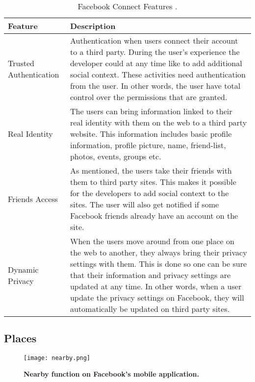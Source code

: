 \begin{center}
\begin{table}[!ht]
\caption{\label{tab:connect}Facebook Connect Features \cite{connect, connect2}.}
    \begin{tabular}{ | l | p{9cm} |}
    \hline
    \textbf{Feature} & \textbf{Description} \\ 
    \hline
    Trusted Authentication & Authentication when users connect their account to a third party. During the user's experience the developer could at any time like to add additional social context. These activities need authentication from the user. In other words, the user have total control over the permissions that are granted. \\ 
    \hline
    Real Identity &  The users can bring information linked to their real identity with them on the web to a third party website. This information includes basic profile information, profile picture, name, friend-list, photos, events, groups etc. \\ 
    \hline
    Friends Access & As mentioned, the users take their friends with them to third party sites. This makes it possible for the developers to add social context to the sites. The user will also get notified if some Facebook friends already have an account on the site.\\
    \hline
    Dynamic Privacy & When the users move around from one place on the web to another, they always bring their privacy settings with them. This is done so one can be sure that their information and privacy settings are updated at any time. In other words, when a user update the privacy settings on Facebook, they will automatically be updated on third party sites.\\
	\hline
    \end{tabular}
   \end{table}
\end{center}


\subsection{Places}
\begin{figure}[t]
\centering
\texttt{[image: nearby.png]}
\caption[Nearby function on Facebook's mobile application]{\textbf{Nearby function on Facebook's mobile application.}} 
\label{fig:nearby}
\end{figure}

